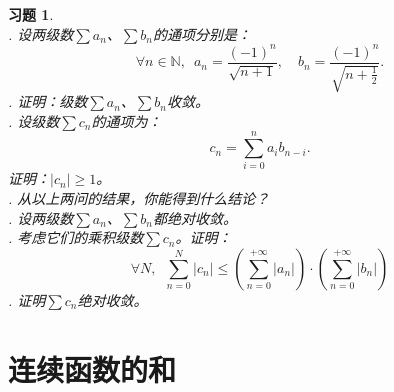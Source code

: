 \documentclass[12pt,UTF8]{ctexbook}
\newtheorem{xt}{习题}[section]
\begin{document}
\begin{xt}
    \mbox{} \\
    . 设两级数$\sum a_n$、$\sum b_n$的通项分别是：
    $$ \forall n\in\mathbb{N}, \,\,\, a_n = \frac{(-1)^n}{\sqrt{n+1}}, \quad b_n = \frac{(-1)^n}{\sqrt{n+\frac{1}{2}}}. $$
    . 证明：级数$\sum a_n$、$\sum b_n$收敛。\\
    . 设级数$\sum c_n$的通项为：
    $$ c_n = \sum_{i=0}^n a_i b_{n-i} . $$
    \indent 证明：$|c_n| \geqslant 1$。\\
    . 从以上两问的结果，你能得到什么结论？\\
    . 设两级数$\sum a_n$、$\sum b_n$都绝对收敛。\\
    . 考虑它们的乘积级数$\sum c_n$。证明：
    $$ \forall N, \,\,\, \sum_{n=0}^{N} |c_n| \leqslant \left(\sum_{n=0}^{+\infty} |a_n| \right) \cdot \left(\sum_{n=0}^{+\infty} |b_n| \right)$$
    . 证明$\sum c_n$绝对收敛。
\end{xt}

\chapter{连续函数的和}
\end{document}
